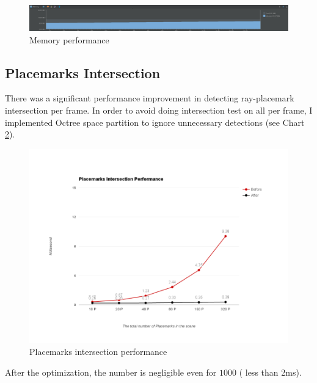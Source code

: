 \begin{figure}[H]
	\caption{Memory performance}
	\label{fig:memory-performance}
	\centering
	\includegraphics[width=\textwidth, keepaspectratio]{Figures/memory-performance.png}
	\decoRule
\end{figure}

\subsection{Placemarks Intersection}
\label{section:placemarks-intersection}

There was a significant performance improvement in detecting ray-placemark intersection per frame. In order to avoid doing intersection test on all  per frame, I implemented Octree space partition to ignore unnecessary detections (see Chart \ref{fig:placemarks-intersection-performance}).

\begin{figure}[H]
	\caption{Placemarks intersection performance}
	\label{fig:placemarks-intersection-performance}
	\centering
	\includegraphics[width=\textwidth, keepaspectratio]{Figures/placemarks-intersection-performance.png}
	\decoRule
\end{figure}

After the optimization, the number is negligible even for $1000$  ( less than 2ms).

